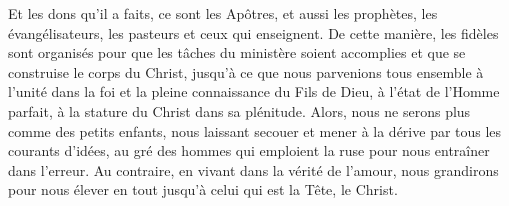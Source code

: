 Et les dons qu’il a faits, ce sont les Apôtres,
	et aussi les prophètes, les évangélisateurs, les pasteurs et ceux qui enseignent.
De cette manière, les fidèles sont organisés
		pour que les tâches du ministère soient accomplies
	et que se construise le corps du Christ,
	jusqu’à ce que nous parvenions tous ensemble à l’unité dans la foi
	et la pleine connaissance du Fils de Dieu,
	à l’état de l’Homme parfait, à la stature du Christ dans sa plénitude.
Alors, nous ne serons plus comme des petits enfants,
	nous laissant secouer et mener à la dérive par tous les courants d’idées,
	au gré des hommes qui emploient la ruse pour nous entraîner dans l’erreur.
Au contraire, en vivant dans la vérité de l’amour,
	nous grandirons pour nous élever en tout jusqu’à celui qui est la Tête, le Christ.
